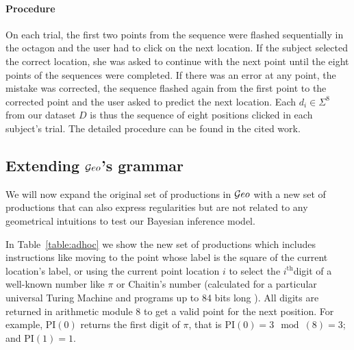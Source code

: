 \paragraph{Procedure} On each trial, the first two points from the sequence were flashed sequentially in the octagon and the user had to click on the next location. If the subject selected the correct location, she was asked to continue with the next point until the eight points of the sequences were completed. If there was an error at any point, the mistake was corrected, the sequence flashed again from the first point to the corrected point and the user asked to predict the next location. Each $d_i \in \Sigma^8$ from our dataset $D$ is thus the sequence of eight positions clicked in each subject's trial. The detailed procedure can be found in the cited work.

\subsection{Extending $\mathcal Geo$'s grammar}

We will now expand the original set of productions in $\mathcal Geo$ with a new set of productions that can also express regularities but are not related to any geometrical intuitions to test our Bayesian inference model.

In Table~\ref{table:adhoc} we show the new set of productions which includes instructions like moving to the point whose label is the square of the current location's label, or using the current point location $i$ to select the $i^\text{th}$digit of a well-known number like $\pi$ or Chaitin's number (calculated for a particular universal Turing Machine and programs up to 84 bits long \cite{calude2002computing}). All digits are returned in arithmetic module 8 to get a valid point for the next position. For example, $\textrm{PI}(0)$  returns the first digit of $\pi$, that is $\textrm{PI}(0)= 3 \mod({8}) = 3$; and $\textrm{PI}(1) = 1$.

